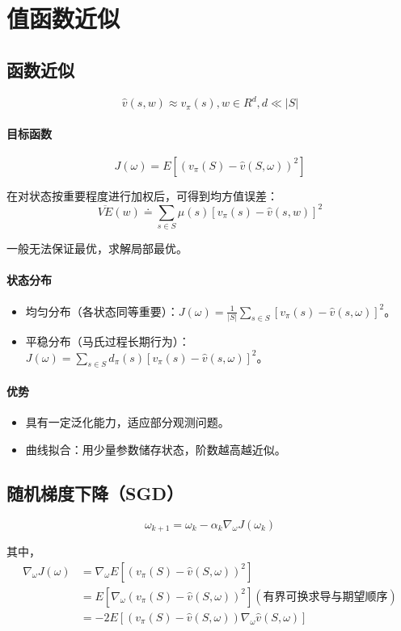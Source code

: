 \documentclass[
12pt, %
a4paper, 
oneside, %
headinclude,footinclude, %
]{scrartcl}
\begin{document}
\section{值函数近似}
\subsection{函数近似}
$$ \hat{v}(s, w) \approx v_{\pi}(s), w \in R^d, d \ll |S| $$
\paragraph{目标函数}
$$ J(\omega) = E[(v_{\pi}(S) - \hat{v}(S, \omega))^2] $$

在对状态按重要程度进行加权后，可得到均方值误差：
$$ \overline{VE} (w) \doteq \sum_{s \in S} \mu(s) [v_\pi(s) - \hat{v}(s, w)]^2 $$

一般无法保证最优，求解局部最优。
\paragraph{状态分布}
\begin{itemize}
\item 均匀分布（各状态同等重要）：$ J(\omega) = \frac{1}{|S|}\sum_{s \in S}[v_{\pi}(s) - \hat{v}(s, \omega)]^2 $。
\item 平稳分布（马氏过程长期行为）：$ J(\omega) = \sum_{s \in S}d_{\pi}(s)[v_{\pi}(s) - \hat{v}(s, \omega)]^2 $。
\end{itemize}
\paragraph{优势}
\begin{itemize}
\item 具有一定泛化能力，适应部分观测问题。
\item 曲线拟合：用少量参数储存状态，阶数越高越近似。
\end{itemize}
\subsection{随机梯度下降（SGD）}
$$ \omega_{k + 1} = \omega_k - \alpha_k \nabla_\omega J(\omega_k) $$

其中，
\begin{align*}
\nabla_\omega J(\omega)
&= \nabla_\omega E[(v_\pi(S) - \hat{v}(S, \omega))^2] \\
&= E[\nabla_\omega (v_\pi(S) - \hat{v}(S, \omega))^2] (\text{有界可换求导与期望顺序}) \\
&= -2E[(v_\pi(S) - \hat{v}(S, \omega)) \nabla_\omega \hat{v}(S, \omega)]
\end{align*}
\end{document}
